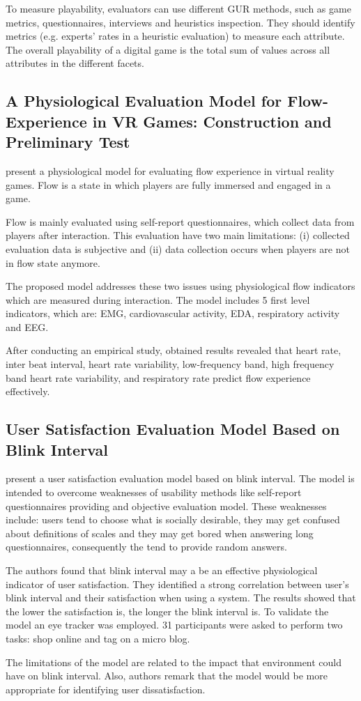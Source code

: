 To measure playability, evaluators can use different \ac{GUR} methods, such as game metrics, questionnaires, interviews and heuristics inspection. They should identify metrics (e.g. experts' rates in a heuristic evaluation) to measure each attribute. The overall playability of a digital game is the total sum of values across all attributes in the different facets.
\subsection{A Physiological Evaluation Model for Flow-Experience in VR Games: Construction and Preliminary Test}

\textcite{Bian2015} present a physiological model for evaluating flow experience in virtual reality games. Flow is a state in which players are fully immersed and engaged in a game.

Flow is mainly evaluated using self-report questionnaires, which collect data from players after interaction. This evaluation have two main limitations: (i) collected evaluation data is subjective and (ii) data collection occurs when players are not in flow state anymore.

The proposed model addresses these two issues using physiological flow indicators which are measured during interaction. The model includes 5 first level indicators, which are: \ac{EMG}, cardiovascular activity, \ac{EDA}, respiratory activity and \ac{EEG}.

After conducting an empirical study, obtained results revealed that heart rate, inter beat interval, heart rate variability, low-frequency band, high frequency band heart rate variability, and respiratory rate predict flow experience effectively.

\subsection{User Satisfaction Evaluation Model Based on Blink Interval}

\textcite{hou2015} present a user satisfaction evaluation model based on blink interval. The model is intended to overcome weaknesses of usability methods like self-report questionnaires providing and objective evaluation model. These weaknesses include: users tend to choose what is socially desirable, they may get confused about definitions of scales and they may get bored when answering long questionnaires, consequently the tend to provide random answers.

The authors found that blink interval may a be an effective physiological indicator of user satisfaction. They identified a strong correlation between user's blink interval and their satisfaction when using a system. The results showed that the lower the satisfaction is, the longer the blink interval is. To validate the model an eye tracker was employed. 31 participants were asked to perform two tasks: shop online and tag on a micro blog.

The limitations of the model are related to the impact that environment could have on blink interval. Also, authors remark that the model would be more appropriate for identifying user dissatisfaction.

